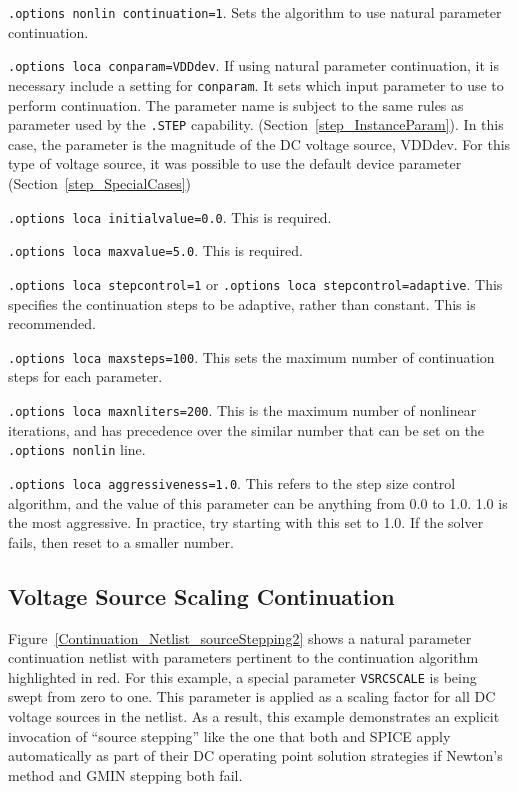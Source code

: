 \begin{XyceItemize}
\item \texttt{.options nonlin continuation=1}.  Sets the algorithm to use natural
parameter continuation.
\item \texttt{.options loca conparam=VDDdev}.  If using natural parameter continuation, it is necessary include a setting for \texttt{conparam}.  It sets which input parameter to use to perform continuation.  The parameter name is subject to the same rules as parameter used by the \texttt{.STEP} capability. (Section~\ref{step_InstanceParam}).  In this case, the parameter is the
magnitude of the DC voltage source, VDDdev.  For this type of voltage
source, it was possible to use the default device parameter (Section~\ref{step_SpecialCases})
\item \texttt{.options loca initialvalue=0.0}.  This is required.
\item \texttt{.options loca maxvalue=5.0}.  This is required.
\item \texttt{.options loca stepcontrol=1} or \texttt{.options loca stepcontrol=adaptive}.  This specifies the continuation steps to be adaptive, rather than constant.  This is recommended.
\item \texttt{.options loca maxsteps=100}.  This sets the maximum number of continuation 
steps for each parameter.  
\item \texttt{.options loca maxnliters=200}.  This is the maximum number of nonlinear 
iterations, and has precedence over the similar number that can be set on
the \texttt{.options nonlin} line.
\item \texttt{.options loca aggressiveness=1.0}.  This refers to the step size 
control algorithm,
and the value of this parameter can be anything from 0.0 to 1.0.  1.0 is
the most aggressive.  In practice, try starting with this set to 1.0. 
If the solver fails, then reset to a smaller number.
\end{XyceItemize}

\subsection{Voltage Source Scaling Continuation}
\label{continuation_scaling}

Figure~\ref{Continuation_Netlist_sourceStepping2} shows a natural
parameter continuation netlist with parameters pertinent to the
continuation algorithm highlighted in red.  For this example, a
special parameter \texttt{VSRCSCALE} is being swept from zero to one.
This parameter is applied as a scaling factor for all DC voltage
sources in the netlist.  As a result, this example demonstrates an
explicit invocation of ``source stepping'' like the one that both
\Xyce{} and SPICE apply automatically as part of their DC operating
point solution strategies if Newton's method and GMIN stepping both
fail.

